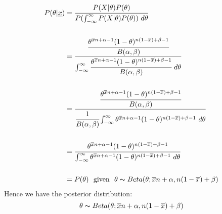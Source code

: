 \documentclass{report}
\begin{document}
\[\begin{split}
		P(\theta|\underline{x}) &= \cfrac{P(X|\theta)P(\theta)}{P(\int_{-\infty}^\infty P(X|\theta)P(\theta)) \ d\theta} \\
		\\
		&= \cfrac{\cfrac{\theta^{\overline{x}n + \alpha - 1}(1 - \theta)^{n(1 - \overline{x}) + \beta - 1}}{B(\alpha,\beta)}}{\int_{-\infty}^\infty \cfrac{\theta^{\overline{x}n + \alpha - 1}(1 - \theta)^{n(1 - \overline{x}) + \beta - 1}}{B(\alpha,\beta)} \ d\theta} \\
		\\
		&= \cfrac{\cfrac{\theta^{\overline{x}n + \alpha - 1}(1 - \theta)^{n(1 - \overline{x}) + \beta - 1}}{B(\alpha,\beta)}}{\cfrac{1}{B(\alpha,\beta)}\int_{-\infty}^\infty \theta^{\overline{x}n + \alpha - 1}(1 - \theta)^{n(1 - \overline{x}) + \beta - 1} \ d\theta} \\
		\\
		&= \cfrac{\theta^{\overline{x}n + \alpha - 1}(1 - \theta)^{n(1 - \overline{x}) + \beta - 1}}{\int_{-\infty}^\infty \theta^{\overline{x}n + \alpha - 1}(1 - \theta)^{n(1 - \overline{x}) + \beta - 1} \ d\theta} \\
		\\
		&= P(\theta) \ \text{ given } \ \theta \thicksim Beta(\theta; \overline{x}n + \alpha, n(1 - \overline{x}) + \beta)
	\end{split}\]
Hence we have the posterior distribution:
\[\theta \thicksim Beta(\theta; \overline{x}n + \alpha, n(1 - \overline{x}) + \beta)\]

\end{document}
